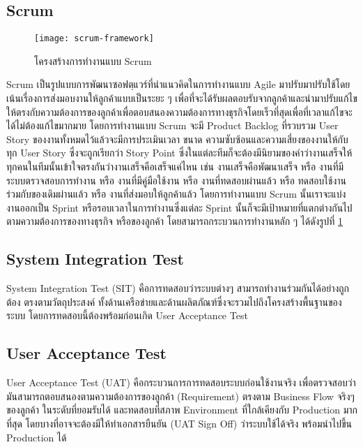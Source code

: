     \subsection{Scrum}
        \begin{figure}[H]
            \centering
            \texttt{[image: scrum-framework]}
            \caption{โครงสร้างการทำงานแบบ Scrum}\label{scrum-framework}
        \end{figure}
        Scrum เป็นรูปแบบการพัฒนาซอฟตฺแวร์ที่นำแนวคิดในการทำงานแบบ Agile มาปรับมาปรับใช้โดยเน้นเรื่องการส่งมอบงานให้ลูกค้าแบบเป็นระยะ ๆ 
        เพื่อที่จะได้รับผลตอบรับจากลูกค้าและนำมาปรับแก้ไขให้ตรงกับความต้องการของลูกค้าเพื่อตอบสนองความต้องการทางธุรกิจโดยเร็วที่สุดเพื่อที่เวลาแก้ไขจะได้ไม่ต้องแก้ไขมากมาย
        โดยการทำงานแบบ Scrum จะมี Product Backlog ที่รวบรวม User Story ของงานทั้งหมดไว้แล้วจะมีการประเมินเวลา ขนาด ความซับซ้อนและความเสี่ยงของงานให้กับทุก
        User Story ซึ่งจะถูกเรียกว่า Story Point ซึ่งในแต่ละทีมก็จะต้องมีนิยามของคำว่างานเสร็จให้ทุกคนในทีมนั้นเข้าใจตรงกันว่างานเสร็จคือเสร็จแค่ไหน เช่น งานเสร็จคือพัฒนาเสร็จ 
        หรือ งานที่มีระบบตรวจสอบการทำงาน หรือ งานที่มีคู่มือใช้งาน หรือ งานที่ทดสอบผ่านแล้ว หรือ ทดสอบใช้งานร่วมกับของเดิมผ่านแล้ว หรือ งานที่ส่งมอบให้ลูกค้าแล้ว
        โดยการทำงานแบบ Scrum นั้นเราจะแบ่งงานออกเป็น Sprint หรือรอบเวลาในการทำงานซึ่งแต่ละ Sprint นั้นก็จะมีเป้าหมายที่แตกต่างกันไปตามความต้องการของทางธุรกิจ หรือของลูกค้า
        โดยสามารถกระบวนการทำงานหลัก ๆ ได้ดังรูปที่ \ref{scrum-framework}

    \subsection{System Integration Test}
        System Integration Test (SIT) คือการทดสอบว่าระบบต่างๆ สามารถทำงานร่วมกันได้อย่างถูกต้อง ตรงตามวัตถุประสงค์ ทั้งด้านเครือข่ายและด้านผลิตภัณฑ์ซึ่งจะรวมไปถึงโครงสร้างพื้นฐานของระบบ โดยการทดสอบนี้ต้องพร้อมก่อนเกิด User Acceptance Test

    \subsection{User Acceptance Test}
        User Acceptance Test (UAT) คือกระบวนการการทดสอบระบบก่อนใช้งานจริง เพื่อตรวจสอบว่ามันสามารถตอบสนองตามความต้องการของลูกค้า (Requirement) ตรงตาม Business Flow จริงๆของลูกค้า ในระดับที่ยอมรับได้ และทดสอบที่สภาพ Environment ที่ใกล้เคียงกับ Production มากที่สุด โดยบางที่อาจจะต้องมีให้ทำเอกสารยืนยัน (UAT Sign Off) ว่าระบบใช้ได้จริง พร้อมนำไปขึ้น Production ได้\cite{uat}

